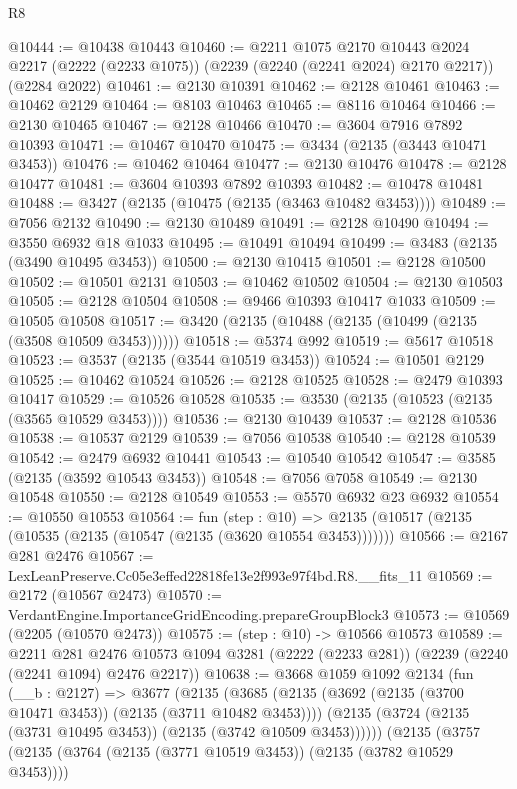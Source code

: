 \begin{lexlean}{R8}
\begin{coremodule}
@10444 := @10438 @10443
@10460 := @2211
    @1075
    @2170
    @10443
    @2024
    @2217
    (@2222 (@2233 @1075))
    (@2239 (@2240 (@2241 @2024) @2170 @2217))
    (@2284 @2022)
@10461 := @2130 @10391
@10462 := @2128 @10461
@10463 := @10462 @2129
@10464 := @8103 @10463
@10465 := @8116 @10464
@10466 := @2130 @10465
@10467 := @2128 @10466
@10470 := @3604 @7916 @7892 @10393
@10471 := @10467 @10470
@10475 := @3434 (@2135 (@3443 @10471 @3453))
@10476 := @10462 @10464
@10477 := @2130 @10476
@10478 := @2128 @10477
@10481 := @3604 @10393 @7892 @10393
@10482 := @10478 @10481
@10488 := @3427 (@2135 (@10475 (@2135 (@3463 @10482 @3453))))
@10489 := @7056 @2132
@10490 := @2130 @10489
@10491 := @2128 @10490
@10494 := @3550 @6932 @18 @1033
@10495 := @10491 @10494
@10499 := @3483 (@2135 (@3490 @10495 @3453))
@10500 := @2130 @10415
@10501 := @2128 @10500
@10502 := @10501 @2131
@10503 := @10462 @10502
@10504 := @2130 @10503
@10505 := @2128 @10504
@10508 := @9466 @10393 @10417 @1033
@10509 := @10505 @10508
@10517 := @3420 (@2135 (@10488 (@2135 (@10499 (@2135 (@3508 @10509 @3453))))))
@10518 := @5374 @992
@10519 := @5617 @10518
@10523 := @3537 (@2135 (@3544 @10519 @3453))
@10524 := @10501 @2129
@10525 := @10462 @10524
@10526 := @2128 @10525
@10528 := @2479 @10393 @10417
@10529 := @10526 @10528
@10535 := @3530 (@2135 (@10523 (@2135 (@3565 @10529 @3453))))
@10536 := @2130 @10439
@10537 := @2128 @10536
@10538 := @10537 @2129
@10539 := @7056 @10538
@10540 := @2128 @10539
@10542 := @2479 @6932 @10441
@10543 := @10540 @10542
@10547 := @3585 (@2135 (@3592 @10543 @3453))
@10548 := @7056 @7058
@10549 := @2130 @10548
@10550 := @2128 @10549
@10553 := @5570 @6932 @23 @6932
@10554 := @10550 @10553
@10564 := fun (step : @10) =>
  @2135 (@10517 (@2135 (@10535 (@2135 (@10547 (@2135 (@3620 @10554 @3453)))))))
@10566 := @2167 @281 @2476
@10567 := LexLeanPreserve.Cc05e3effed22818fe13e2f993e97f4bd.R8.__fits_11
@10569 := @2172 (@10567 @2473)
@10570 := VerdantEngine.ImportanceGridEncoding.prepareGroupBlock3
@10573 := @10569 (@2205 (@10570 @2473))
@10575 := (step : @10) -> @10566 @10573
@10589 := @2211
    @281
    @2476
    @10573
    @1094
    @3281
    (@2222 (@2233 @281))
    (@2239 (@2240 (@2241 @1094) @2476 @2217))
@10638 := @3668
    @1059
    @1092
    @2134
    (fun (__b : @2127) =>
    @3677
      (@2135
        (@3685
          (@2135 (@3692 (@2135 (@3700 @10471 @3453)) (@2135 (@3711 @10482 @3453))))
          (@2135 (@3724 (@2135 (@3731 @10495 @3453)) (@2135 (@3742 @10509 @3453))))))
      (@2135
        (@3757
          (@2135 (@3764 (@2135 (@3771 @10519 @3453)) (@2135 (@3782 @10529 @3453))))

\end{coremodule}
\end{lexlean}
